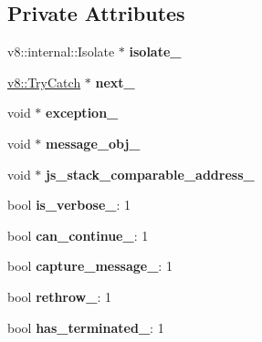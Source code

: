 \subsection*{Private Attributes}
\begin{DoxyCompactItemize}
\item 
v8\+::internal\+::\+Isolate $\ast$ {\bfseries isolate\+\_\+}\hypertarget{classv8_1_1_try_catch_a41cd5bd5fd37c48d6e0392f769a789d5}{}\label{classv8_1_1_try_catch_a41cd5bd5fd37c48d6e0392f769a789d5}

\item 
\hyperlink{classv8_1_1_try_catch}{v8\+::\+Try\+Catch} $\ast$ {\bfseries next\+\_\+}\hypertarget{classv8_1_1_try_catch_a2e9b54b01f7f97f42af5b7b377918334}{}\label{classv8_1_1_try_catch_a2e9b54b01f7f97f42af5b7b377918334}

\item 
void $\ast$ {\bfseries exception\+\_\+}\hypertarget{classv8_1_1_try_catch_a4ae6a166af0336716516addc1f64fe1f}{}\label{classv8_1_1_try_catch_a4ae6a166af0336716516addc1f64fe1f}

\item 
void $\ast$ {\bfseries message\+\_\+obj\+\_\+}\hypertarget{classv8_1_1_try_catch_a6efc81ccc783f40c660f0e709b578aaa}{}\label{classv8_1_1_try_catch_a6efc81ccc783f40c660f0e709b578aaa}

\item 
void $\ast$ {\bfseries js\+\_\+stack\+\_\+comparable\+\_\+address\+\_\+}\hypertarget{classv8_1_1_try_catch_a0f685aca812478ad996fabac7c291e89}{}\label{classv8_1_1_try_catch_a0f685aca812478ad996fabac7c291e89}

\item 
bool {\bfseries is\+\_\+verbose\+\_\+}\+: 1\hypertarget{classv8_1_1_try_catch_a3c2798d8716a14df4550bfadefdcf6a7}{}\label{classv8_1_1_try_catch_a3c2798d8716a14df4550bfadefdcf6a7}

\item 
bool {\bfseries can\+\_\+continue\+\_\+}\+: 1\hypertarget{classv8_1_1_try_catch_a92c1bd92eecbc728d6c2150c338fef7d}{}\label{classv8_1_1_try_catch_a92c1bd92eecbc728d6c2150c338fef7d}

\item 
bool {\bfseries capture\+\_\+message\+\_\+}\+: 1\hypertarget{classv8_1_1_try_catch_ad1f5b0368678fa2bd0d73ac17acf976e}{}\label{classv8_1_1_try_catch_ad1f5b0368678fa2bd0d73ac17acf976e}

\item 
bool {\bfseries rethrow\+\_\+}\+: 1\hypertarget{classv8_1_1_try_catch_a6c8efeb878409539d0863314fba98a23}{}\label{classv8_1_1_try_catch_a6c8efeb878409539d0863314fba98a23}

\item 
bool {\bfseries has\+\_\+terminated\+\_\+}\+: 1\hypertarget{classv8_1_1_try_catch_a00a16327470f47613764b652b15d0f71}{}\label{classv8_1_1_try_catch_a00a16327470f47613764b652b15d0f71}

\end{DoxyCompactItemize}
